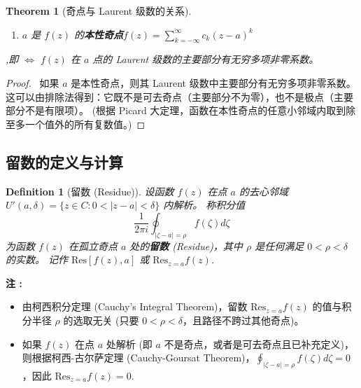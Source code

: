 \documentclass[linespread=1.5,openany]{book}%
\def\C{C}%
\def\diff{d}%
\theoremstyle{plain}
\newtheorem{theorem}{Theorem}
\newtheorem{definition}{Definition}
\newcommand{\diff}{\mathop{}\!\mathrm{d}}  %
\newcommand{\C}{\mathbb{C}}                %
\begin{document}
{{{{{{{{\begin{theorem}[奇点与 Laurent 级数的关系]
\begin{enumerate}[label=\arabic*)]
												
												
												
												
												\item $a$ 是 $f(z)$ 的\textbf{本性奇点}$f(z) = \sum_{k=-\infty}^{\infty} c_k (z-a)^k $
											\end{enumerate},即 $\iff$ $f(z)$ 在 $a$ 点的 Laurent 级数的主要部分有无穷多项非零系数。 
										\end{theorem}
										
										\begin{proof}\
											如果 $a$ 是本性奇点，则其 Laurent 级数中主要部分有无穷多项非零系数。
											这可以由排除法得到：它既不是可去奇点（主要部分不为零），也不是极点（主要部分不是有限项）。
											(根据 Picard 大定理，函数在本性奇点的任意小邻域内取到除至多一个值外的所有复数值。)
										\end{proof}
										
										
										
									} %
								}
								
								\subsection{留数的定义与计算 }
								{ %
									
									\begin{definition}[留数 (Residue)] \label{def:L16_residue}
										设函数 $f(z)$ 在点 $a$ 的去心邻域 $U'(a,\delta) = \{z \in \C : 0 < |z-a| < \delta\}$ 内解析。
										称积分值
										\[ \frac{1}{2\pi i} \oint_{|\zeta-a|=\rho} f(\zeta) \diff \zeta \]
										为函数 $f(z)$ 在孤立奇点 $a$ 处的\textbf{留数} (Residue)，其中 $\rho$ 是任何满足 $0 < \rho < \delta$ 的实数。
										记作 $\text{Res}[f(z), a]$ 或 $\text{Res}_{z=a} f(z)$.
									\end{definition}
									
									\textbf{注 :}
									\begin{itemize}
										\item 由柯西积分定理 (Cauchy's Integral Theorem)，留数 $\text{Res}_{z=a} f(z)$ 的值与积分半径 $\rho$ 的选取无关 (只要 $0 < \rho < \delta$，且路径不跨过其他奇点)。
										\item 如果 $f(z)$ 在点 $a$ 处解析 (即 $a$ 不是奇点，或者是可去奇点且已补充定义)，则根据柯西-古尔萨定理 (Cauchy-Goursat Theorem)，$\oint_{|\zeta-a|=\rho} f(\zeta) \diff \zeta = 0$，因此 $\text{Res}_{z=a} f(z) = 0$.
									\end{itemize}
									
}}}}}}}
\end{document}
